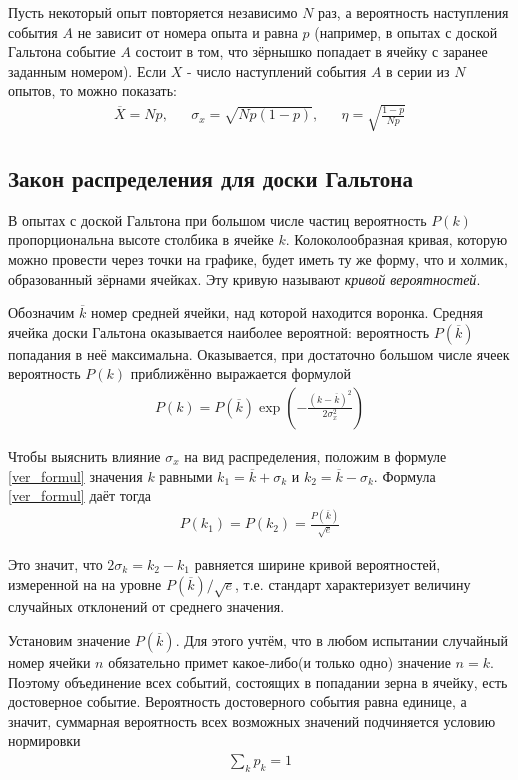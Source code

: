 Пусть некоторый опыт повторяется независимо $N$ раз, а вероятность наступления события $A$ не зависит от номера опыта и равна $p$ (например, в опытах с доской Гальтона событие $A$ состоит в том, что зёрнышко попадает в ячейку с заранее заданным номером). Если $X$ - число наступлений события $A$ в серии из $N$ опытов, то можно показать:
\begin{align} \label{16}
	\overline{X} = N p, && \sigma_x = \sqrt{N p (1 - p)}, && \eta = \sqrt{\frac{1 - p}{N p}}
\end{align}

\subsection{Закон распределения для доски Гальтона}

В опытах с доской Гальтона при большом числе частиц вероятность $P(k)$ пропорциональна высоте столбика в ячейке $k$. Колоколообразная кривая, которую можно провести через точки на графике, будет иметь ту же форму, что и холмик, образованный зёрнами  ячейках. Эту кривую называют \textit{кривой вероятностей}.

Обозначим $\overline{k}$ номер средней ячейки, над которой находится воронка. Средняя ячейка доски Гальтона оказывается наиболее вероятной: вероятность $P(\overline{k})$ попадания в неё максимальна. Оказывается, при достаточно большом числе ячеек вероятность $P(k)$ приближённо выражается формулой
\begin{align} \label{ver_formul}
	P(k) = P(\overline{k})
	\exp \left( - \frac{(k - \overline{k})^2}{2 \sigma_x^2} \right)
\end{align}

Чтобы выяснить влияние $\sigma_x$ на вид распределения, положим в формуле \eqref{ver_formul} значения $k$ равными $k_1 = \overline{k} + \sigma_k$ и $k_2 = \overline{k} - \sigma_k$. Формула \eqref{ver_formul} даёт тогда 
\begin{align*}
	P(k_1) = P(k_2) = \frac{P(\overline{k})}{\sqrt{e}} 
\end{align*}

Это значит, что $2\sigma_k = k_2 - k_1$ равняется ширине кривой вероятностей, измеренной на на уровне ${P(\overline{k})}/{\sqrt{e}}$, т.е. стандарт характеризует величину случайных отклонений от среднего значения.

Установим значение $P(\overline{k})$. Для этого учтём, что в любом испытании случайный номер ячейки $n$ обязательно примет какое-либо(и только одно) значение $n = k$. Поэтому объединение всех событий, состоящих в попадании зерна в ячейку, есть достоверное событие. Вероятность достоверного события равна единице, а значит, суммарная вероятность всех возможных значений подчиняется условию нормировки 
\begin{align} \label{usl_normir}
	\sum_{k} p_k = 1
\end{align}

